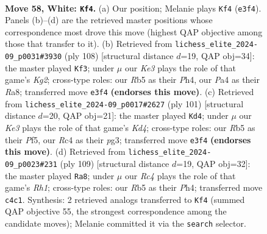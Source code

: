 \documentclass[11pt]{article}
\begin{document}
\clearpage

\begin{figure}[p]\centering
\begin{subfigure}{0.46\textwidth}\centering
\resizebox{\linewidth}{!}{%
\newchessgame
\chessboard[
  setfen={8/5p2/4pk2/1R6/P1R1P3/4KP1r/8/8 w - - 7 58},
  showmover=false,
  pgfstyle=straightmove, color=movearrow, markmove={e3-f4}
]}
\caption{}
\end{subfigure}\hfill
\begin{subfigure}{0.46\textwidth}\centering
\resizebox{\linewidth}{!}{%
\newchessgame
\chessboard[
  setfen={R7/8/P5pk/7p/7P/6P1/r4PK1/8 w - - 3 55},
  showmover=false,
  pgfstyle=straightmove, color=movearrow, markmove={g2-f3}
]}
\caption{}
\end{subfigure}
\\[4pt]
\begin{subfigure}{0.46\textwidth}\centering
\resizebox{\linewidth}{!}{%
\newchessgame
\chessboard[
  setfen={8/8/2r3pp/3k1p2/7P/5KP1/2p2P2/2R5 b - - 1 51},
  showmover=false,
  pgfstyle=straightmove, color=movearrow, markmove={d5-d4}
]}
\caption{}
\end{subfigure}\hfill
\begin{subfigure}{0.46\textwidth}\centering
\resizebox{\linewidth}{!}{%
\newchessgame
\chessboard[
  setfen={7r/8/2R2pk1/6p1/7p/5K1P/6P1/8 b - - 3 55},
  showmover=false,
  pgfstyle=straightmove, color=movearrow, markmove={h8-a8}
]}
\caption{}
\end{subfigure}
\caption{\textbf{Move 58, White: \texttt{Kf4}.} (a) Our position; Melanie plays \texttt{Kf4} (\texttt{e3f4}). Panels (b)--(d) are the retrieved master positions whose correspondence most drove this move (highest QAP objective among those that transfer to it). (b) Retrieved from \texttt{lichess\_elite\_2024-09\_p0031\#3930} (ply 108) [structural distance $d$=19, QAP obj=34]: the master played \texttt{Kf3}; under $\mu$ our \emph{Ke3} plays the role of that game's \emph{Kg2}; cross-type roles: our \emph{R}b5 as their \emph{P}h4, our \emph{P}a4 as their \emph{R}a8; transferred move \texttt{e3f4} \textbf{(endorses this move)}. (c) Retrieved from \texttt{lichess\_elite\_2024-09\_p0017\#2627} (ply 101) [structural distance $d$=20, QAP obj=21]: the master played \texttt{Kd4}; under $\mu$ our \emph{Ke3} plays the role of that game's \emph{Kd4}; cross-type roles: our \emph{R}b5 as their \emph{P}f5, our \emph{R}c4 as their \emph{p}g3; transferred move \texttt{e3f4} \textbf{(endorses this move)}. (d) Retrieved from \texttt{lichess\_elite\_2024-09\_p0023\#231} (ply 109) [structural distance $d$=19, QAP obj=32]: the master played \texttt{Ra8}; under $\mu$ our \emph{Rc4} plays the role of that game's \emph{Rh1}; cross-type roles: our \emph{R}b5 as their \emph{P}h4; transferred move \texttt{c4c1}. Synthesis: 2 retrieved analogs transferred to \texttt{Kf4} (summed QAP objective 55, the strongest correspondence among the candidate moves); Melanie committed it via the \texttt{search} selector.}
\label{fig:thought-m114}
\end{figure}
\end{document}
